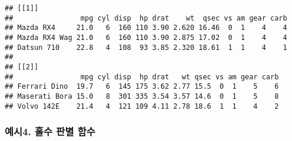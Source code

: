 \documentclass[
]{article}
\newenvironment{Shaded}{\begin{snugshade}}{\end{snugshade}}
\newcommand{\CommentTok}[1]{\textcolor[rgb]{0.56,0.35,0.01}{\textit{#1}}}
\newcommand{\ControlFlowTok}[1]{\textcolor[rgb]{0.13,0.29,0.53}{\textbf{#1}}}
\newcommand{\DecValTok}[1]{\textcolor[rgb]{0.00,0.00,0.81}{#1}}
\newcommand{\KeywordTok}[1]{\textcolor[rgb]{0.13,0.29,0.53}{\textbf{#1}}}
\newcommand{\NormalTok}[1]{#1}
\newcommand{\OperatorTok}[1]{\textcolor[rgb]{0.81,0.36,0.00}{\textbf{#1}}}
\newcommand{\StringTok}[1]{\textcolor[rgb]{0.31,0.60,0.02}{#1}}
\begin{document}
\begin{Shaded}
\end{Shaded}

\begin{verbatim}
## [[1]]
##                mpg cyl disp  hp drat    wt  qsec vs am gear carb
## Mazda RX4     21.0   6  160 110 3.90 2.620 16.46  0  1    4    4
## Mazda RX4 Wag 21.0   6  160 110 3.90 2.875 17.02  0  1    4    4
## Datsun 710    22.8   4  108  93 3.85 2.320 18.61  1  1    4    1
## 
## [[2]]
##                mpg cyl disp  hp drat   wt qsec vs am gear carb
## Ferrari Dino  19.7   6  145 175 3.62 2.77 15.5  0  1    5    6
## Maserati Bora 15.0   8  301 335 3.54 3.57 14.6  0  1    5    8
## Volvo 142E    21.4   4  121 109 4.11 2.78 18.6  1  1    4    2
\end{verbatim}

\hypertarget{uxc608uxc2dc4.-uxd640uxc218-uxd310uxbcc4-uxd568uxc218}{%
\subsubsection{예시4. 홀수 판별
함수}\label{uxc608uxc2dc4.-uxd640uxc218-uxd310uxbcc4-uxd568uxc218}}

\begin{Shaded}
\end{Shaded}
\end{document}
